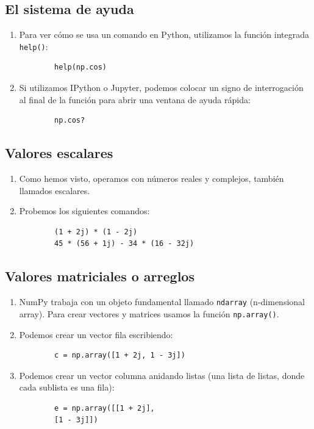 \subsection{El sistema de ayuda}

\begin{enumerate}
	\item Para ver cómo se usa un comando en Python, utilizamos la función integrada \texttt{help()}:
	\begin{verbatim}
		help(np.cos)
	\end{verbatim}
	\item Si utilizamos IPython o Jupyter, podemos colocar un signo de interrogación al final de la función para abrir una ventana de ayuda rápida:
	\begin{verbatim}
		np.cos?
	\end{verbatim}
\end{enumerate}

\subsection{Valores escalares}

\begin{enumerate}
	\item Como hemos visto, operamos con números reales y complejos, también llamados escalares.
	\item Probemos los siguientes comandos:
	\begin{verbatim}
		(1 + 2j) * (1 - 2j)
		45 * (56 + 1j) - 34 * (16 - 32j)
	\end{verbatim}
\end{enumerate}

\subsection{Valores matriciales o arreglos}

\begin{enumerate}
	\item NumPy trabaja con un objeto fundamental llamado \texttt{ndarray} (n-dimensional array). Para crear vectores y matrices usamos la función \texttt{np.array()}.
	\item Podemos crear un vector fila escribiendo:
	\begin{verbatim}
		c = np.array([1 + 2j, 1 - 3j])
	\end{verbatim}
	
	\item Podemos crear un vector columna anidando listas (una lista de listas, donde cada sublista es una fila):
	\begin{verbatim}
		e = np.array([[1 + 2j], 
		[1 - 3j]])
	\end{verbatim}
\end{enumerate}

